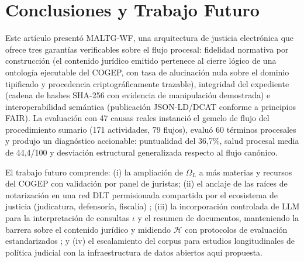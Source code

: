 \documentclass[computers,article,submit,pdftex,moreauthors]{Definitions/mdpi}
\begin{document}
\section{Conclusiones y Trabajo Futuro}
\label{sec:conclusions}

Este artículo presentó MALTG-WF, una arquitectura de justicia electrónica que ofrece tres garantías verificables sobre el flujo procesal: fidelidad normativa por construcción (el contenido jurídico emitido pertenece al cierre lógico de una ontología ejecutable del COGEP, con tasa de alucinación nula sobre el dominio tipificado y procedencia criptográficamente trazable), integridad del expediente (cadena de hashes SHA-256 con evidencia de manipulación demostrada) e interoperabilidad semántica (publicación JSON-LD/DCAT conforme a principios FAIR). La evaluación con 47 causas reales instanció el gemelo de flujo del procedimiento sumario (171 actividades, 79 flujos), evaluó 60 términos procesales y produjo un diagnóstico accionable: puntualidad del 36{,}7\%, salud procesal media de 44{,}4/100 y desviación estructural generalizada respecto al flujo canónico.

El trabajo futuro comprende: (i) la ampliación de $\Omega_L$ a más materias y recursos del COGEP con validación por panel de juristas; (ii) el anclaje de las raíces de notarización en una red DLT permisionada compartida por el ecosistema de justicia (judicatura, defensoría, fiscalía) \cite{Olnes2017}; (iii) la incorporación controlada de LLM para la interpretación de consultas $\iota$ y el resumen de documentos, manteniendo la barrera sobre el contenido jurídico y midiendo $\mathcal{H}$ con protocolos de evaluación estandarizados \cite{Huang2025}; y (iv) el escalamiento del corpus para estudios longitudinales de política judicial con la infraestructura de datos abiertos aquí propuesta.

\vspace{6pt}




\end{document}
